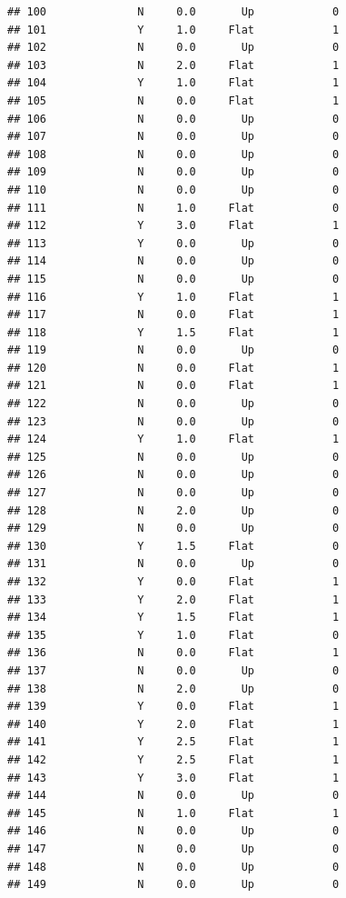 \documentclass[
]{article}
\begin{document}
\begin{verbatim}
## 100              N     0.0       Up            0
## 101              Y     1.0     Flat            1
## 102              N     0.0       Up            0
## 103              N     2.0     Flat            1
## 104              Y     1.0     Flat            1
## 105              N     0.0     Flat            1
## 106              N     0.0       Up            0
## 107              N     0.0       Up            0
## 108              N     0.0       Up            0
## 109              N     0.0       Up            0
## 110              N     0.0       Up            0
## 111              N     1.0     Flat            0
## 112              Y     3.0     Flat            1
## 113              Y     0.0       Up            0
## 114              N     0.0       Up            0
## 115              N     0.0       Up            0
## 116              Y     1.0     Flat            1
## 117              N     0.0     Flat            1
## 118              Y     1.5     Flat            1
## 119              N     0.0       Up            0
## 120              N     0.0     Flat            1
## 121              N     0.0     Flat            1
## 122              N     0.0       Up            0
## 123              N     0.0       Up            0
## 124              Y     1.0     Flat            1
## 125              N     0.0       Up            0
## 126              N     0.0       Up            0
## 127              N     0.0       Up            0
## 128              N     2.0       Up            0
## 129              N     0.0       Up            0
## 130              Y     1.5     Flat            0
## 131              N     0.0       Up            0
## 132              Y     0.0     Flat            1
## 133              Y     2.0     Flat            1
## 134              Y     1.5     Flat            1
## 135              Y     1.0     Flat            0
## 136              N     0.0     Flat            1
## 137              N     0.0       Up            0
## 138              N     2.0       Up            0
## 139              Y     0.0     Flat            1
## 140              Y     2.0     Flat            1
## 141              Y     2.5     Flat            1
## 142              Y     2.5     Flat            1
## 143              Y     3.0     Flat            1
## 144              N     0.0       Up            0
## 145              N     1.0     Flat            1
## 146              N     0.0       Up            0
## 147              N     0.0       Up            0
## 148              N     0.0       Up            0
## 149              N     0.0       Up            0

\end{verbatim}
\end{document}
